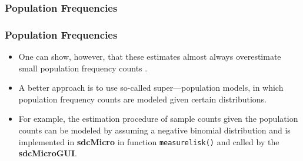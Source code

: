 \documentclass{beamer}
\begin{document}
	\begin{frame}	
		\frametitle{Population Frequencies}
		

\end{frame}
	\begin{frame}	
		\frametitle{Population Frequencies}
		
		\begin{itemize}
	\item One can show, however, that these estimates almost always overestimate small
	population frequency counts .
	
	\item A better approach is to use so-called super—population models, in which population frequency
	counts are modeled given certain distributions. 
	
	\item For example, the estimation procedure of sample counts given the population counts can be modeled by assuming
	a negative binomial distribution and is implemented
	in \textbf{sdcMicro} in function \texttt{measurelisk()}
	and called by the
	\textbf{sdcMicroGUI}.
\end{itemize}	
\end{frame}
\end{document}
